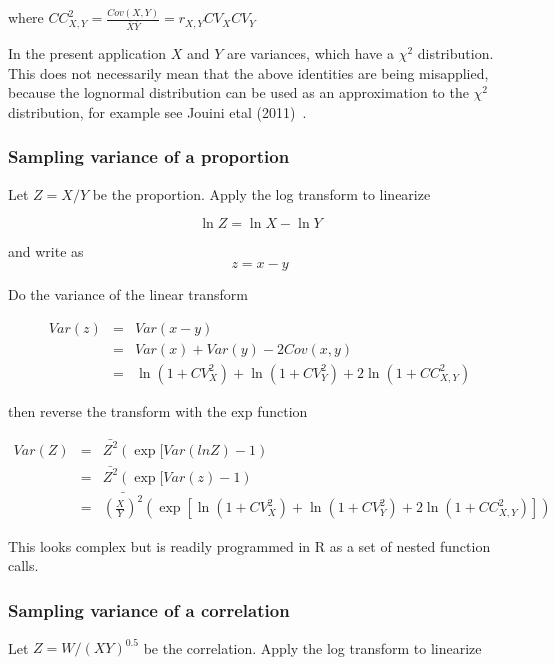 \documentclass[titlepage]{article}  %
\begin{document}
where $ CC^{2}_{X,Y} = \frac{Cov(X,Y)}{\overline{X}\overline{Y}} = r_{X,Y}CV_{X}CV_{Y}$

In the present application $X$ and $Y$ are variances, which have a $\chi^{2}$ distribution. This does not necessarily mean that the above identities are being misapplied, because the lognormal distribution can be used as an approximation to the $\chi^{2}$ distribution, for example see Jouini etal (2011)~\cite{joui:11}.

\subsubsection{Sampling variance of a proportion}

Let $Z = X/Y$ be the proportion. Apply the log transform to linearize

\begin{displaymath}
\ln Z = \ln X - \ln Y
\end{displaymath}
 
and write as
\begin{displaymath}
z = x - y
\end{displaymath}

Do the variance of the linear transform


\begin{eqnarray*}
Var(z) & = & Var(x-y) \\
       & = & Var(x) + Var(y) - 2Cov(x,y) \\
       & = & \ln(1 + CV^{2}_{X}) + \ln(1 + CV^{2}_{Y}) + 2 \ln(1 + CC^{2}_{X,Y})
\end{eqnarray*}

then reverse the transform with the exp function

\begin{eqnarray*}
Var(Z) & = & \bar{Z^{2}}(\exp[Var(lnZ) - 1) \\
       & = & \bar{Z^{2}}(\exp[Var(z) - 1) \\
       & = & \bar{(\frac{X}{Y})^{2}}(\exp[\ln(1+CV^{2}_{X}) + \ln(1 + CV^{2}_{Y}) + 2 \ln(1 + CC^{2}_{X,Y})])
\end{eqnarray*}

This looks complex but is readily programmed in R as a set of nested function calls.


\subsubsection{Sampling variance of a correlation}
 
Let $Z = W/(XY)^{0.5}$ be the correlation. Apply the log transform to linearize
\end{document}

